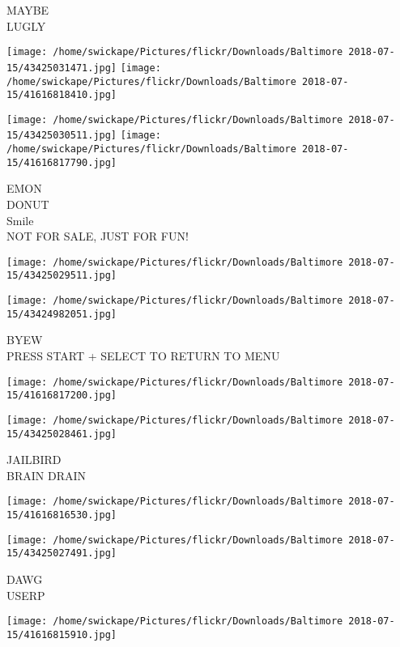 \documentclass[10pt,letterpaper]{article}
\begin{document}
MAYBE\\
LUGLY\\
\pagebreak

\texttt{[image: /home/swickape/Pictures/flickr/Downloads/Baltimore 2018-07-15/43425031471.jpg]}
\texttt{[image: /home/swickape/Pictures/flickr/Downloads/Baltimore 2018-07-15/41616818410.jpg]}

\texttt{[image: /home/swickape/Pictures/flickr/Downloads/Baltimore 2018-07-15/43425030511.jpg]}
\texttt{[image: /home/swickape/Pictures/flickr/Downloads/Baltimore 2018-07-15/41616817790.jpg]}

EMON\\
DONUT\\
Smile\\
NOT FOR SALE, JUST FOR FUN!\\
\pagebreak

\texttt{[image: /home/swickape/Pictures/flickr/Downloads/Baltimore 2018-07-15/43425029511.jpg]}

\vspace{0.25in}
\texttt{[image: /home/swickape/Pictures/flickr/Downloads/Baltimore 2018-07-15/43424982051.jpg]}

BYEW\\
PRESS START + SELECT TO RETURN TO MENU\\
\pagebreak

\texttt{[image: /home/swickape/Pictures/flickr/Downloads/Baltimore 2018-07-15/41616817200.jpg]}

\vspace{0.25in}
\texttt{[image: /home/swickape/Pictures/flickr/Downloads/Baltimore 2018-07-15/43425028461.jpg]}

JAILBIRD\\
BRAIN DRAIN\\
\pagebreak

\texttt{[image: /home/swickape/Pictures/flickr/Downloads/Baltimore 2018-07-15/41616816530.jpg]}

\vspace{0.25in}
\texttt{[image: /home/swickape/Pictures/flickr/Downloads/Baltimore 2018-07-15/43425027491.jpg]}

DAWG\\
USERP\\
\pagebreak

\texttt{[image: /home/swickape/Pictures/flickr/Downloads/Baltimore 2018-07-15/41616815910.jpg]}
\end{document}
